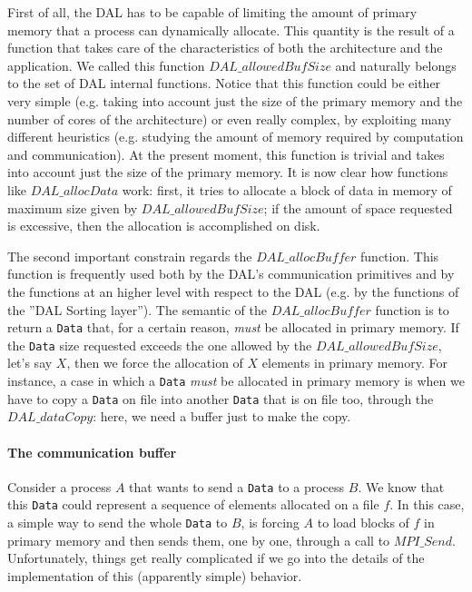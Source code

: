 First of all, the DAL has to be capable of limiting the amount of primary memory that a process can dynamically allocate. This quantity is the result of a function that takes care of the characteristics of both the architecture and the application. We called this function $DAL\_allowedBufSize$ and naturally belongs to the set of DAL internal functions. Notice that this function could be either very simple (e.g. taking into account just the size of the primary memory and the number of cores of the architecture) or even really complex, by exploiting many different heuristics (e.g. studying the amount of memory required by computation and communication). At the present moment, this function is trivial and takes into account just the size of the primary memory. It is now clear how functions like $DAL\_allocData$ work: first, it tries to allocate a block of data in memory of maximum size given by $DAL\_allowedBufSize$; if the amount of space requested is excessive, then the allocation is accomplished on disk. 

The second important constrain regards the $DAL\_allocBuffer$ function. This function is frequently used both by the DAL's communication primitives and by the functions at an higher level with respect to the DAL (e.g. by the functions of the ''DAL Sorting layer''). The semantic of the $DAL\_allocBuffer$ function is to return a \texttt{Data} that, for a certain reason, \textit{must} be allocated in primary memory. If the \texttt{Data} size requested exceeds the one allowed by the $DAL\_allowedBufSize$, let's say $X$, then we force the allocation of $X$ elements in primary memory. For instance, a case in which a \texttt{Data} \textit{must} be allocated in primary memory is when we have to copy a \texttt{Data} on file into another \texttt{Data} that is on file too, through the $DAL\_dataCopy$: here, we need a buffer just to make the copy.  

\paragraph{The communication buffer}
Consider a process $A$ that wants to send a \texttt{Data} to a process $B$. We know that this \texttt{Data} could represent a sequence of elements allocated on a file $f$. In this case, a simple way to send the whole \texttt{Data} to $B$, is forcing $A$ to load blocks of $f$ in primary memory and then sends them, one by one, through a call to $MPI\_Send$.  Unfortunately, things get really complicated if we go into the details of the implementation of this (apparently simple) behavior. 

